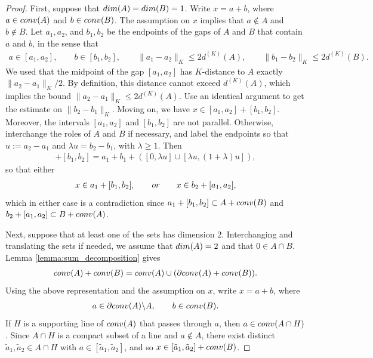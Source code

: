 \documentclass[10pt,a4paper]{amsart}
\begin{document}
\begin{proof}
    First, suppose that $\textup{dim}(A)=\textup{dim}(B)=1$. Write $x=a+b$, where $a\in \textup{conv}(A)$ and $b\in \textup{conv}(B)$. The assumption on $x$ implies that $a\notin A$ and $b\notin B$. Let $a_1,a_2$, and $b_1,b_2$ be the endpoints of the gaps of $A$ and $B$ that contain $a$ and $b$, in the sense that
    \begin{align*}
        a\in [a_1,a_2],\qquad b\in [b_1,b_2],\qquad \|a_1-a_2\|_K\leq 2d^{(K)}(A),\qquad \|b_1-b_2\|_K\leq 2d^{(K)}(B).
    \end{align*}
    We used that the midpoint of the gap $[a_1,a_2]$ has $K$-distance to $A$ exactly $\|a_2-a_1\|_K/2$. By definition, this distance cannot exceed $d^{(K)}(A)$, which implies the bound $\|a_2-a_1\|_K\leq 2d^{(K)}(A)$. Use an identical argument to get the estimate on $\|b_2-b_1\|_K$. Moving on, we have $x\in [a_1,a_2]+[b_1,b_2]$. Moreover, the intervals $[a_1,a_2]$ and $[b_1,b_2]$ are not parallel. Otherwise, interchange the roles of $A$ and $B$ if necessary, and label the endpoints so that $u:=a_2-a_1$ and $\lambda u=b_2-b_1$, with $\lambda\geq 1$. Then
    \begin{align*}
        [a_1,a_2]+[b_1,b_2]=a_1+b_1+([0,\lambda u]\cup [\lambda u,(1+\lambda)u]),
    \end{align*}
    so that either 
    \begin{align*}
        x\in a_1+[b_1,b_2],\qquad \textup{or}\qquad x\in b_2+[a_1,a_2],
    \end{align*}
    which in either case is a contradiction since $a_1+[b_1,b_2]\subset A+\textup{conv}(B)$ and $b_2+[a_1,a_2]\subset B+\textup{conv}(A)$.

    Next, suppose that at least one of the sets has dimension $2$. Interchanging and translating the sets if needed, we assume that $\textup{dim}(A)=2$ and that $0\in A\cap B$. Lemma \ref{lemma:sum_decomposition} gives
    \begin{align*}
        \textup{conv}(A)+\textup{conv}(B)=\textup{conv}(A)\cup (\partial \textup{conv}(A)+\textup{conv}(B)).
    \end{align*}
    Using the above representation and the assumption on $x$, write $x=a+b$, where 
    \begin{align*}
        a\in \partial\textup{conv}(A)\backslash A,\qquad b\in \textup{conv}(B).
    \end{align*}
    If $H$ is a supporting line of $\textup{conv}(A)$ that passes through $a$, then $a\in \textup{conv}(A\cap H)$. Since $A\cap H$ is a compact subset of a line and $a\notin A$, there exist distinct $\tilde{a}_1,\tilde{a}_2\in A\cap H$ with $a\in [\tilde{a}_1,\tilde{a}_2]$, and so $x\in [\tilde{a}_1,\tilde{a}_2]+\textup{conv}(B)$.


\end{proof}
\end{document}
